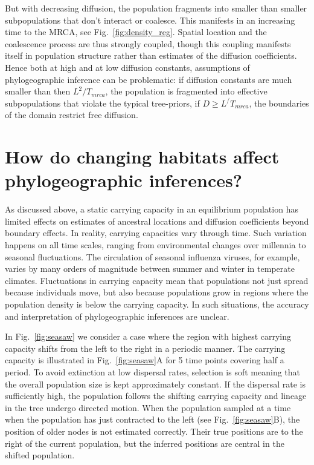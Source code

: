 \documentclass[aps,rmp, twocolumn]{revtex4}
\begin{document}
But with decreasing diffusion, the population fragments into smaller than smaller subpopulations that don't interact or coalesce.
This manifests in an increasing time to the MRCA, see Fig.~\ref{fig:density_reg}.
Spatial location and the coalescence process are thus strongly coupled, though this coupling manifests itself in population structure rather than estimates of the diffusion coefficients.
Hence both at high and at low diffusion constants, assumptions of phylogeographic inference can be problematic: if diffusion constants are much smaller than then $L^2/T_{mrca}$, the population is fragmented into effective subpopulations that violate the typical tree-priors, if $D\geq L^/T_{mrca}$, the boundaries of the domain restrict free diffusion.

\section*{How do changing habitats affect phylogeographic inferences?}
As discussed above, a static carrying capacity in an equilibrium population has limited effects on estimates of ancestral locations and diffusion coefficients beyond boundary effects.
In reality, carrying capacities vary through time.
Such variation happens on all time scales, ranging from environmental changes over millennia to seasonal fluctuations.
The circulation of seasonal influenza viruses, for example, varies by many orders of magnitude between summer and winter in temperate climates.
Fluctuations in carrying capacity mean that populations not just spread because individuals move, but also because populations grow in regions where the population density is below the carrying capacity.
In such situations, the accuracy and interpretation of phylogeographic inferences are unclear.

In Fig.~\ref{fig:seasaw} we consider a case where the region with highest carrying capacity shifts from the left to the right in a periodic manner.
The carrying capacity is illustrated in Fig.~\ref{fig:seasaw}A for 5 time points covering half a period.
To avoid extinction at low dispersal rates, selection is soft meaning that the overall population size is kept approximately constant.
If the dispersal rate is sufficiently high, the population follows the shifting carrying capacity and lineage in the tree undergo directed motion.
When the population sampled at a time when the population has just contracted to the left (see Fig.~\ref{fig:seasaw}B), the position of older nodes is not estimated correctly.
Their true positions are to the right of the current population, but the inferred positions are central in the shifted population.
\end{document}

